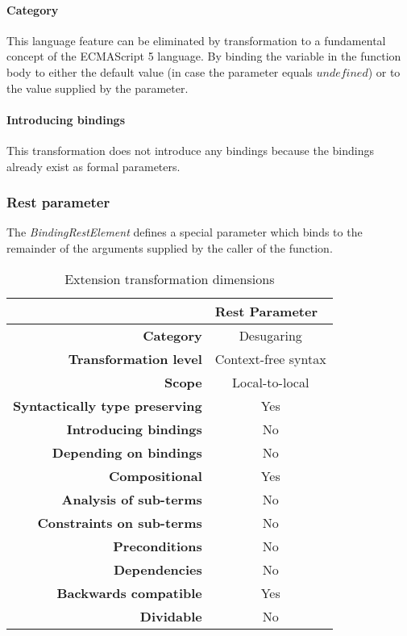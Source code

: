 \documentclass[10pt,a4paper]{article}
\begin{document}
\paragraph{Category}
This language feature can be eliminated by transformation to a fundamental concept of the ECMAScript 5 language. By binding the variable in the function body to either the default value (in case the parameter equals $undefined$) or to the value supplied by the parameter.

\paragraph{Introducing bindings}
This transformation does not introduce any bindings because the bindings already exist as formal parameters.

\subsubsection{Rest parameter}
The \textit{BindingRestElement} defines a special parameter which binds to the remainder of the arguments supplied by the caller of the function.\cite[14.1]{SpecJS}

\begin{table}[H]
\centering
\caption{Extension transformation dimensions}
\label{rest-parameter-table}
\begin{tabular}{@{}rc@{}}
\toprule
                                       & \multicolumn{1}{l}{\textbf{Rest Parameter}} \\ \midrule
\textbf{Category}                      & Desugaring
\\
\textbf{Transformation level}          & Context-free syntax                          \\
\textbf{Scope}                         & Local-to-local                               \\
\textbf{Syntactically type preserving} & Yes                                          \\
\textbf{Introducing bindings}          & No                                          \\%
\textbf{Depending on bindings}         & No                                           \\
\textbf{Compositional}                 & Yes                                          \\
\textbf{Analysis of sub-terms}          & No                                          \\
\textbf{Constraints on sub-terms}       & No                                           \\
\textbf{Preconditions}                 & No                                          \\
\textbf{Dependencies}                  & No                                           \\
\textbf{Backwards compatible}          & Yes                                          \\
\textbf{Dividable}                     & No                                           \\ \bottomrule
\end{tabular}
\end{table}
\end{document}
